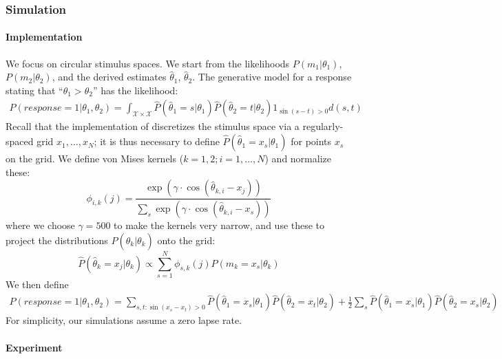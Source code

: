 \documentclass[si.tex]{subfiles}
\begin{document}
\subsubsection{Simulation}\label{sec:2afc-experiment}


\paragraph*{Implementation}
We focus on circular stimulus spaces.
We start from the likelihoods $P(m_1|\theta_1)$, $P(m_2|\theta_2)$, and the derived estimates $\widehat{\theta}_1$, $\widehat{\theta}_2$.
The generative model for a response stating that ``$\theta_1 > \theta_2$'' has the likelihood:
\begin{align*}
    P(response=1|\theta_1, \theta_2) = \int_{\mathcal{X} \times \mathcal{X}} \widehat{P}(\widehat{\theta}_1=s|\theta_1) \widehat{P}(\widehat{\theta}_2=t|\theta_2) 1_{\sin(s-t) > 0} d(s,t)
\end{align*}
Recall that the implementation of \citet{hahn2024unifying} discretizes the stimulus space via a regularly-spaced grid $x_1, \dots, x_N$; it is thus necessary to define $\widehat{P}(\widehat{\theta}_1=x_s|\theta_1)$ for points $x_s$ on the grid.
We define von Mises kernels ($k=1,2; i = 1, \dots, N$) and normalize these:
\begin{equation}
    \phi_{i,k}(j) = \frac{\exp(\gamma \cdot \cos(\widehat{\theta}_{k,i} - x_j))}{\sum_s \exp(\gamma \cdot \cos(\widehat{\theta}_{k,i} - x_s))}
\end{equation}
where we choose $\gamma = 500$ to make the kernels very narrow, and use these to project the distributions $P(\widehat{\theta}_k|\theta_k)$ onto the grid:
\begin{equation}
    \widehat{P}(\widehat{\theta}_k=x_j|\theta_k) \propto \sum_{s=1}^N \phi_{s,k}(j) P(m_k = x_s|\theta_k)
\end{equation}
We then define
\begin{align*}
    P(response=1|\theta_1, \theta_2) = \sum_{s,t : \sin(x_s-x_t) > 0} \widehat{P}(\widehat{\theta}_1=x_s|\theta_1) \widehat{P}(\widehat{\theta}_2=x_t|\theta_2) + \frac{1}{2} \sum_{s} \widehat{P}(\widehat{\theta}_1=x_s|\theta_1) \widehat{P}(\widehat{\theta}_2=x_s|\theta_2)
\end{align*}
For simplicity, our simulations assume a zero lapse rate.

\paragraph*{Experiment}
\end{document}
